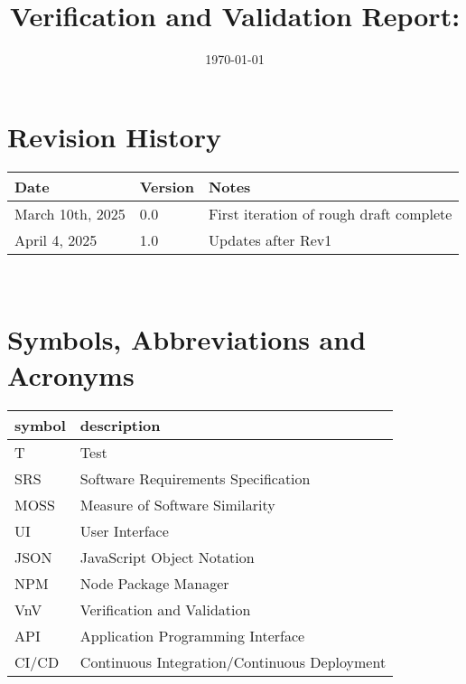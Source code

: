 \documentclass[12pt, titlepage]{article}
\begin{document}
\title{Verification and Validation Report: \progname} 
\author{\authname}
\date{\today}
	
\maketitle


\section{Revision History}

\begin{tabularx}{\textwidth}{p{3cm}p{2cm}X}
\toprule {\bf Date} & {\bf Version} & {\bf Notes}\\
\midrule
March 10th, 2025 & 0.0 & First iteration of rough draft complete\\
April 4, 2025 & 1.0 & Updates after Rev1\\
\bottomrule
\end{tabularx}

~\newpage

\section{Symbols, Abbreviations and Acronyms}

\renewcommand{\arraystretch}{1.2}
\begin{tabular}{l l} 
  \toprule		
  \textbf{symbol} & \textbf{description}\\
  \midrule 
  T & Test\\
  SRS & Software Requirements Specification \\
  MOSS & Measure of Software Similarity \\
  UI & User Interface \\
  JSON & JavaScript Object Notation \\
  NPM & Node Package Manager \\
  VnV & Verification and Validation \\
  API & Application Programming Interface \\
  CI/CD & Continuous Integration/Continuous Deployment\\
  \bottomrule
\end{tabular}\\

\newpage

\tableofcontents

\listoftables %
\end{document}
